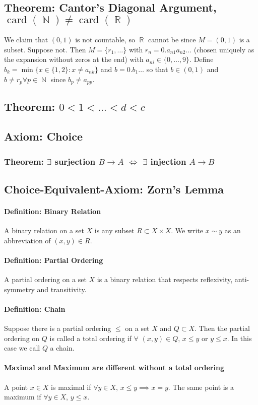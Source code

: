\documentclass{article}
\DeclareMathOperator\R{\mathbb{R}}
\DeclareMathOperator\N{\mathbb{N}}
\DeclareMathOperator\cd{card}
\begin{document}
\subsection*{Theorem: Cantor's Diagonal Argument, $\cd(\N) \neq \cd(\R)$}
We claim that $(0,1)$ is not countable, so $\R$ cannot be since $M = (0,1)$ is a subset.
Suppose not. Then $M = \{r_1,\hdots \}$
with $r_n = 0.a_{n1}a_{n2}\hdots$ (chosen uniquely as the expansion
without zeros at the end) with $a_{ni} \in \{0,\hdots,9\}$. Define $b_k = \min\{ x \in \{ 1,2\}: x \neq a_{nk} \}$
and $b = 0.b_1\hdots$ so that $b \in (0,1)$ and $b \neq r_p \forall p \in \N$
since $b_p \neq a_{pp}$.
\subsection*{Theorem: $0 < 1 < \hdots < d < c$}
\subsection*{Axiom: Choice}
\subsubsection*{Theorem: $\exists$ surjection $B \to A$ $\iff$ $\exists$ injection $A \to B$}
\subsection*{Choice-Equivalent-Axiom: Zorn's Lemma}
\paragraph{Definition: Binary Relation}
A binary relation on a set $X$ is any subset $R \subset X \times X$. We write $x \sim y$ as an abbreviation of $(x,y) \in R$.
\paragraph{Definition: Partial Ordering}
A partial ordering on a set $X$ is a binary relation that respects reflexivity, anti-symmetry and transitivity.
\paragraph{Definition: Chain}
Suppose there is a partial ordering $\leq$ on a set $X$ and $Q \subset X$. Then
the partial ordering on $Q$ is called a total ordering if $\forall \,\, (x,y) \in Q$, $x \leq y$ or $y \leq x$. In this case we call $Q$ a chain.
\paragraph{Maximal and Maximum are different without a total ordering}
A point $x \in X$ is maximal if $\forall y \in X$, $x \leq y \implies x=y$. The same point is a maximum if $\forall y \in X$, $y \leq x$.
\end{document}
